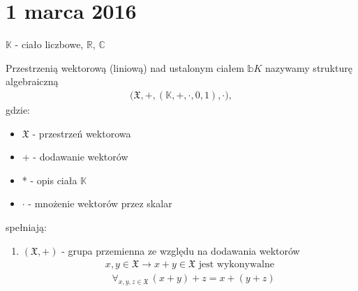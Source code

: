 \chapter{1 marca 2016}
$ \mathbb K $ - ciało liczbowe, $ \mathbb R $, $ \mathbb C $
\begin{defi}
Przestrzenią wektorową (liniową) nad ustalonym ciałem $ \mathbb bK $ nazywamy strukturę algebraiczną\begin{gather*}
\bigl(\mathfrak X,+,\left(\mathbb K,+,\cdot,0,1\right),\cdot\bigr),
\end{gather*}
gdzie:
\begin{itemize}
\item $ \mathfrak X $ - przestrzeń wektorowa
\item + - dodawanie wektorów
\item * - opis ciała $ \mathbb K $
\item $ \cdot $ - mnożenie wektorów przez skalar
\end{itemize}
spełniają:
\begin{enumerate}
\item $ (\mathfrak X,+) $ - grupa przemienna ze względu na dodawania wektorów
\begin{gather*}
x,y\in\mathfrak X\to x+y\in \mathfrak X\text{ jest wykonywalne}
\end{gather*}
\begin{align*}
&\forall_{x,y,z\in\mathfrak X}\,(x+y)+z=x+(y+z)\\

\end{align*}
\end{enumerate}
\end{defi}
